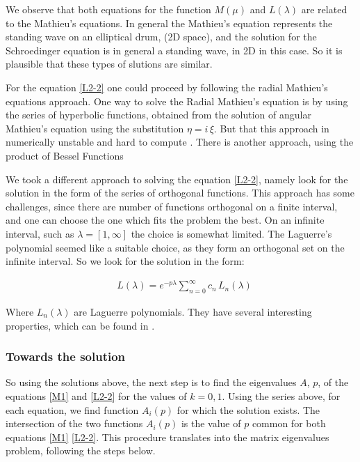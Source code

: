 We observe that both equations for the function $ M(\mu) $ and $ L(\lambda) $ are related to the Mathieu's equations. In general the Mathieu's equation represents the standing wave on an elliptical drum, (2D space),  and the solution for the Schroedinger equation is in general a standing wave, in 2D in this case. So it is plausible that these types of slutions are similar.

For the equation \eqref{L2-2} one could proceed by following the radial Mathieu's equations approach. One way to solve the Radial Mathieu's equation is by using the series of hyperbolic functions, obtained from the solution of angular Mathieu's equation using the substitution $ \eta = i\,\xi$.  But that this approach in numerically unstable and hard to compute \cite{Mathieu4}. There is another approach, using the product of Bessel Functions \cite{Mathieu4}

We took a different approach to solving the equation \eqref{L2-2}, namely look for the solution in the form of the series of orthogonal functions. This approach has some challenges, since there are number of functions orthogonal on a finite interval, and one can choose the one which fits the problem the best. On an infinite interval, such as $ \lambda = [1, \infty] $ the choice is somewhat limited. The Laguerre's polynomial seemed like a suitable choice, as they form an orthogonal set on the infinite interval. So we look for the solution in the form:

\begin{equation}\label{Lsol1}
\begin{split}
& L(\lambda) =  e^{-p\lambda}\sum_{n=0}^{\infty}{c_n\,L_n(\lambda)}
\end{split}
\end{equation}

Where $ L_n(\lambda) $ are Laguerre polynomials. They have several interesting properties, which can be found in \cite{Laguerre1}.

\subsubsection{ Towards the solution }

So using the solutions above, the next step is to find the eigenvalues $ A $, $ p $, of the equations \eqref{M1} and \eqref{L2-2} for the values of $ k = 0,1 $. Using the series above, for each equation, we find function  $ A_i(p) $ for which the solution exists. The intersection of the two functions $ A_i(p) $ is the value of $ p $ common for both equations \eqref{M1} \eqref{L2-2}. This procedure translates into the matrix eigenvalues problem, following the steps below.

